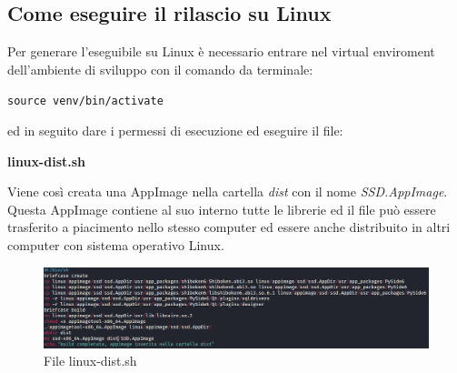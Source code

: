 \subsection{Come eseguire il rilascio su Linux}
Per generare l'eseguibile su Linux è necessario entrare nel virtual enviroment dell'ambiente di sviluppo con il comando da terminale:
\newline{}\centerline{\texttt{source venv/bin/activate}}\newline{}
ed in seguito dare i permessi di esecuzione ed eseguire il file:
\newline{}\centerline{\textbf{linux-dist.sh}}\newline{}
Viene così creata una AppImage nella cartella \textit{dist} con il nome \textit{SSD.AppImage}. \\
Questa AppImage contiene al suo interno tutte le librerie ed il file può essere trasferito a piacimento nello stesso computer ed essere anche distribuito in altri computer con sistema operativo Linux.
\begin{figure}[H]
    \centering
    \includegraphics[scale = 0.2]{components/img/linux-deploy-script.png}
    \caption{File linux-dist.sh}
    \label{fig:File win-dist.bat}
\end{figure}

